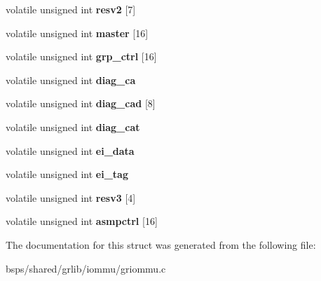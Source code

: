 \begin{DoxyCompactItemize}
\mbox{\label{structgriommu__regs_a54d0bfc18154ebcfd40776f57216f06f}} 
volatile unsigned int {\bfseries resv2} \mbox{[}7\mbox{]}
\item 
\mbox{\label{structgriommu__regs_a1878fb4dde86ab58793c589f318f4a24}} 
volatile unsigned int {\bfseries master} \mbox{[}16\mbox{]}
\item 
\mbox{\label{structgriommu__regs_a88368548fa313227e91840b32d079223}} 
volatile unsigned int {\bfseries grp\+\_\+ctrl} \mbox{[}16\mbox{]}
\item 
\mbox{\label{structgriommu__regs_a2ee7efab75cf60decab6225d3c7324c8}} 
volatile unsigned int {\bfseries diag\+\_\+ca}
\item 
\mbox{\label{structgriommu__regs_ab357315395c1536c6fd5fcc5a44cb897}} 
volatile unsigned int {\bfseries diag\+\_\+cad} \mbox{[}8\mbox{]}
\item 
\mbox{\label{structgriommu__regs_ae8b42752478d606488d3e6c0e4dc37a5}} 
volatile unsigned int {\bfseries diag\+\_\+cat}
\item 
\mbox{\label{structgriommu__regs_a6cf9b4baf03bfa1b552f0e197bec20d1}} 
volatile unsigned int {\bfseries ei\+\_\+data}
\item 
\mbox{\label{structgriommu__regs_af921e878e8c7e49bf118c4936887284b}} 
volatile unsigned int {\bfseries ei\+\_\+tag}
\item 
\mbox{\label{structgriommu__regs_a90de7cde0dde8ba928f49692f7a8e534}} 
volatile unsigned int {\bfseries resv3} \mbox{[}4\mbox{]}
\item 
\mbox{\label{structgriommu__regs_adc94615384cf6b84dbc6e653fe772c44}} 
volatile unsigned int {\bfseries asmpctrl} \mbox{[}16\mbox{]}
\end{DoxyCompactItemize}


The documentation for this struct was generated from the following file\+:\begin{DoxyCompactItemize}
\item 
bsps/shared/grlib/iommu/griommu.\+c\end{DoxyCompactItemize}
